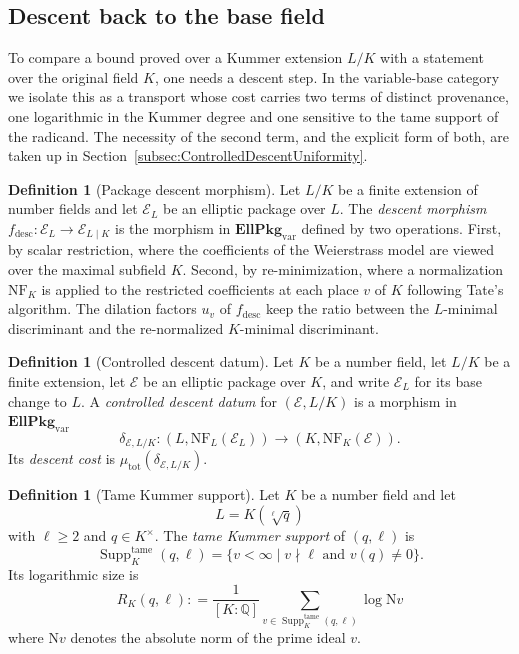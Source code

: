 \documentclass[10pt, reqno]{amsart}
\theoremstyle{plain}
\theoremstyle{definition}
\newtheorem{definition}[theorem]{Definition}
\theoremstyle{plain}
\newcommand{\Q}{\mathbb{Q}}
\newcommand{\coloneqq}{\mathrel{\mathop:}=}
\begin{document}
\subsection{Descent back to the base field}\label{subsec:ControlledDescentBridge}

To compare a bound proved over a Kummer extension $L/K$ with a statement over the original field $K$, one needs a descent step. In the variable-base category we isolate this as a transport whose cost carries two terms of distinct provenance, one logarithmic in the Kummer degree and one sensitive to the tame support of the radicand. The necessity of the second term, and the explicit form of both, are taken up in Section~\ref{subsec:ControlledDescentUniformity}.

\begin{definition}[Package descent morphism]\label{def:DescentMorphism}
Let $L/K$ be a finite extension of number fields and let $\mathcal{E}_L$ be an elliptic package over $L$. The \emph{descent morphism} $f_{\mathrm{desc}} \colon \mathcal{E}_L \to \mathcal{E}_{L\mid K}$ is the morphism in $\mathbf{EllPkg}_{\mathrm{var}}$ defined by two operations. First, by scalar restriction, where the coefficients of the Weierstrass model are viewed over the maximal subfield $K$. Second, by re-minimization, where a normalization $\mathrm{NF}_K$ is applied to the restricted coefficients at each place $v$ of $K$ following Tate's algorithm. The dilation factors $u_v$ of $f_{\mathrm{desc}}$ keep the ratio between the $L$-minimal discriminant and the re-normalized $K$-minimal discriminant.
\end{definition}

\begin{definition}[Controlled descent datum]\label{def:ControlledDescentDatum}
Let $K$ be a number field, let $L/K$ be a finite extension, let $\mathcal{E}$ be an elliptic package over $K$, and write $\mathcal{E}_L$ for its base change to $L$. A \emph{controlled descent datum} for $(\mathcal{E},L/K)$ is a morphism in $\mathbf{EllPkg}_{\mathrm{var}}$
\begin{equation}\label{eq:ControlledDescentMorphism}
  \delta_{\mathcal{E},L/K} \colon (L,\mathrm{NF}_L(\mathcal{E}_L))
  \longrightarrow (K,\mathrm{NF}_K(\mathcal{E})).
\end{equation}
Its \emph{descent cost} is $\mu_{\mathrm{tot}}(\delta_{\mathcal{E},L/K})$.
\end{definition}

\begin{definition}[Tame Kummer support]\label{def:TameKummerSupport}
Let $K$ be a number field and let
\[
  L=K(\sqrt[\ell]{q})
\]
with $\ell\ge 2$ and $q\in K^{\times}$. The \emph{tame Kummer support} of $(q,\ell)$ is
\[
  \operatorname{Supp}^{\mathrm{tame}}_{K}(q,\ell)
  =
  \bigl\{
    v<\infty
    \mid
    v\nmid \ell
    \text{ and }
    v(q)\ne 0
  \bigr\}.
\]
Its logarithmic size is
\[
  R_{K}(q,\ell)
  \coloneqq
  \frac{1}{[K:\Q]}
  \sum_{v\in \operatorname{Supp}^{\mathrm{tame}}_{K}(q,\ell)}
  \log \mathrm{N}v
\]
where $\mathrm{N}v$ denotes the absolute norm of the prime ideal $v$.
\end{definition}
\end{document}
